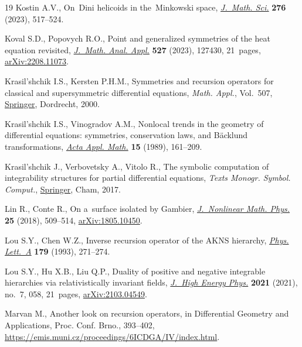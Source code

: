 \documentclass[pdftex]{sigma}
\numberwithin{equation}{section}
\theoremstyle{definition}
\begin{document}
\begin{thebibliography}{19}
Kostin A.V., On~{D}ini helicoids in the~{M}inkowski space,
 \href{https://doi.org/10.1007/s10958-023-06772-9}{\textit{J.~Math. Sci.}}
 \textbf{276} (2023), 517--524.

Koval S.D., Popovych R.O., Point and generalized symmetries of the heat
 equation revisited,
 \href{https://doi.org/10.1016/j.jmaa.2023.127430}{\textit{J.~Math. Anal.
 Appl.}} \textbf{527} (2023), 127430, 21~pages,
 \href{http://arxiv.org/abs/2208.11073}{arXiv:2208.11073}.

Krasil'shchik I.S., Kersten P.H.M., Symmetries and recursion operators for
 classical and supersymmetric differential equations, \textit{Math. Appl.},
 Vol.~507, \href{https://doi.org/10.1007/978-94-017-3196-6}{Springer}, Dordrecht, 2000.

Krasil'shchik I.S., Vinogradov A.M., Nonlocal trends in the geometry of
 differential equations: symmetries, conservation laws, and {B}\"acklund
 transformations, \href{https://doi.org/10.1007/BF00131935}{\textit{Acta Appl.
 Math.}} \textbf{15} (1989), 161--209.

Krasil'shchik J., Verbovetsky A., Vitolo R., The symbolic computation of
 integrability structures for partial differential equations, \textit{Texts Monogr.
 Symbol. Comput.}, \href{https://doi.org/10.1007/978-3-319-71655-8}{Springer},
 Cham, 2017.

Lin R., Conte R., On a~surface isolated by Gambier,
 \href{https://doi.org/10.48550/arXiv.1805.10450}{\textit{J.~Nonlinear Math.
 Phys.}} \textbf{25} (2018), 509--514,
 \href{http://arxiv.org/abs/1805.10450}{arXiv:1805.10450}.

Lou S.Y., Chen W.Z., Inverse recursion operator of the {AKNS} hierarchy,
 \href{https://doi.org/10.1016/0375-9601(93)90677-R}{\textit{Phys. Lett.~A}}
 \textbf{179} (1993), 271--274.

Lou S.Y., Hu X.B., Liu Q.P., Duality of positive and negative integrable
 hierarchies via relativistically invariant fields,
 \href{https://doi.org/10.1007/jhep07(2021)058}{\textit{J.~High Energy Phys.}}
 \textbf{2021} (2021), no.~7, 058, 21~pages,
 \href{http://arxiv.org/abs/2103.04549}{arXiv:2103.04549}.

Marvan M., Another look on recursion operators, in Differential {G}eometry and
 {A}pplications, Proc. Conf. Brno., 393--402, \url{https://emis.muni.cz/proceedings/6ICDGA/IV/index.html}.


\end{thebibliography}
\end{document}
